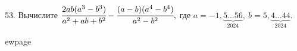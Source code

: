 53. Вычислите $\cfrac{2ab(a^3-b^3)}{a^2+ab+b^2}-\cfrac{(a-b)(a^4-b^4)}{a^2-b^2},$ где $a=-1,\underbrace{5\ldots56}_{2024},\ b=5,\underbrace{4\ldots44}_{2024}.$

ewpage
